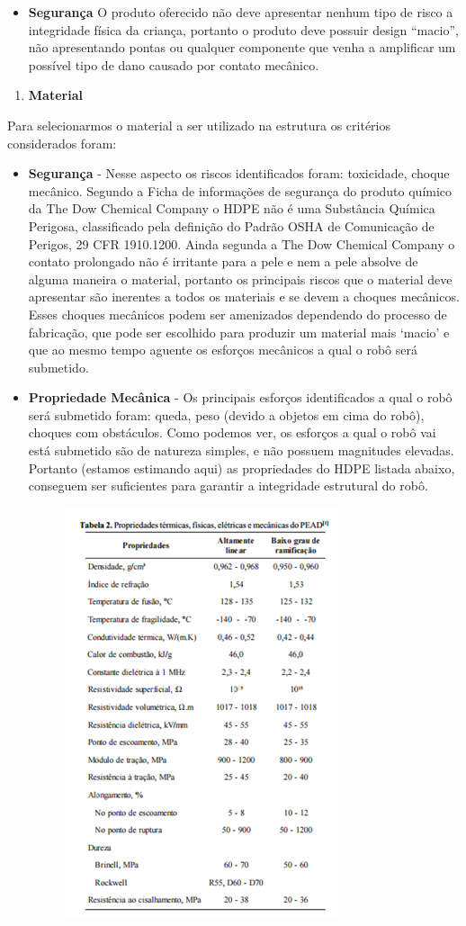 \begin{itemize}
  \item \textbf{Segurança} O produto oferecido não deve apresentar nenhum tipo de risco a integridade física da criança, portanto o produto deve possuir design “macio”, não apresentando pontas ou qualquer componente que venha a amplificar um possível tipo de dano causado por contato mecânico.
\end{itemize}

\begin{enumerate}
  \item \textbf{Material} 
\end{enumerate}

Para selecionarmos o material a ser utilizado na estrutura os critérios considerados foram:

\begin{itemize}
  \item \textbf{Segurança} - Nesse aspecto os riscos identificados foram: toxicidade, choque mecânico.
  Segundo a Ficha de informações de segurança do produto químico da The Dow Chemical Company o HDPE não é uma Substância Química Perigosa, classificado pela definição do Padrão OSHA de Comunicação de Perigos, 29 CFR 1910.1200. Ainda segunda a The Dow Chemical Company o contato prolongado não é irritante para a pele e nem a pele absolve de alguma maneira o material, portanto os principais riscos que o material deve apresentar são inerentes a todos os materiais e se devem a choques mecânicos. Esses choques mecânicos podem ser amenizados dependendo do processo de fabricação, que pode ser escolhido para produzir um material mais ‘macio’ e que ao mesmo tempo aguente os esforços mecânicos a qual o robô será submetido.
  \item \textbf{Propriedade Mecânica} - Os principais esforços identificados a qual o robô será submetido foram: queda, peso (devido a objetos em cima do robô), choques com obstáculos.
  Como podemos ver, os esforços a qual o robô vai está submetido são de natureza simples, e não possuem magnitudes elevadas. Portanto (estamos estimando aqui) as propriedades do HDPE listada abaixo, conseguem ser suficientes para garantir a integridade estrutural do robô.
  \begin{figure}[!h]
    \centering
    \includegraphics[width=.5\textwidth]{edit/img/especificacao.png}

\end{figure}
\end{itemize}
